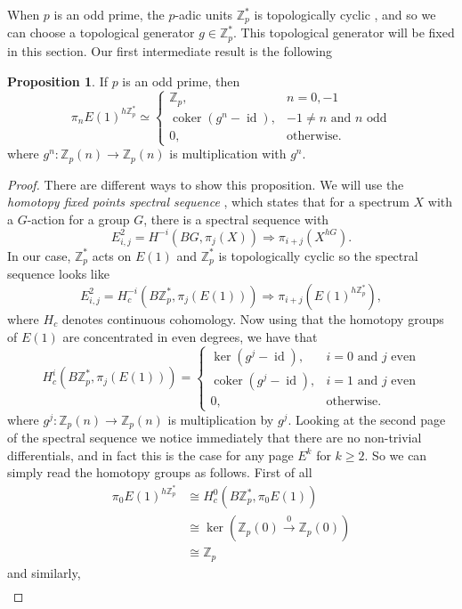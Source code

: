 \documentclass[a4paper]{article} %
\theoremstyle{definition}
\newtheorem{proposition}[theorem]{Proposition}
\newcommand{\toWithMapLong}[1]{\overset{#1}{\longrightarrow}}
\newcommand{\Z}{\mathbb{Z}}
\DeclareMathOperator{\id}{id}           %
\DeclareMathOperator{\coker}{coker}     %
\renewcommand{\implies}{\Rightarrow}    %
\begin{document}
When $p$ is an odd prime, the $p$-adic units $\Z_p^*$ is topologically cyclic , and so we can choose a topological generator $g \in \Z_p^*$. This topological generator will be fixed in this section. Our first intermediate result is the following
\begin{proposition}
  If $p$ is an odd prime, then
  \[
   \pi_n E(1)^{h\Z_p^*} \simeq
     \begin{cases}
     \Z_p, & n=0,-1 \\
     \coker (g^n - \id), & -1 \neq n \text{ and $n$ odd} \\
     0, & \text{otherwise.}
     \end{cases}
   \]
   where  $g^n \colon \Z_p(n) \to \Z_p(n)$ is multiplication with $g^n$.
\end{proposition}
\begin{proof}
There are different ways to show this proposition. We will use the \textit{homotopy fixed points spectral sequence} , which states that for a spectrum $X$ with a $G$-action for a group $G$, there is a spectral sequence with
\[
E^2_{i,j} = H^{-i}(BG, \pi_j(X)) \implies \pi_{i+j}(X^{hG}).
\]
In our case, $\Z_p^*$ acts on $E(1)$ and $\Z_p^*$ is topologically cyclic so the spectral sequence looks like
\[
E^2_{i,j} = H_c^{-i}(B\Z_p^*, \pi_j(E(1))) \implies \pi_{i+j}(E(1)^{h\Z_p^*}),
\]
where $H_c$ denotes continuous cohomology. Now using that the homotopy groups of $E(1)$ are concentrated in even degrees, we have that
\[
  H^i_c(B\Z_p^*, \pi_j(E(1))) =
\begin{cases}
\ker (g^j - \id), & i=0 \text{ and } j \text{ even} \\
\coker (g^j - \id), & i=1 \text{ and } j \text{ even} \\
0, & \text{otherwise.}
\end{cases}
\]
where $g^j \colon \Z_p(n) \to \Z_p(n)$ is multiplication by $g^j$. Looking at the second page of the spectral sequence  we notice immediately that there are no non-trivial differentials, and in fact this is the case for any page $E^k$ for $k \ge 2$. So we can simply read  the homotopy groups as follows. First of all
\begin{align*}
  \pi_0 E(1)^{h\Z_p^*} & \cong  H^0_c(B\Z_p^*, \pi_0 E(1)) \\
    & \cong \ker (\Z_p(0) \toWithMapLong{0} \Z_p(0)) \\
    & \cong \Z_p
\end{align*}
and similarly,
\begin{align*}

\end{align*}
\end{proof}
\end{document}
